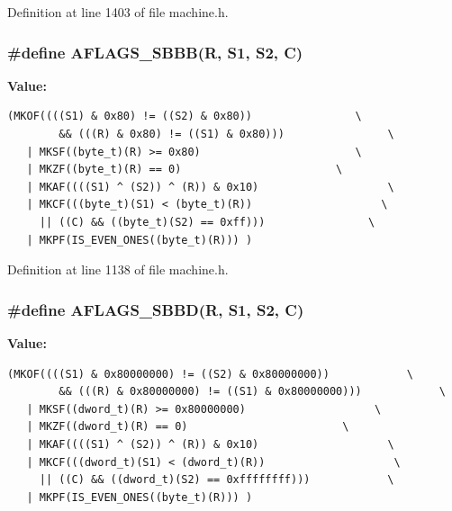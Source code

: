 Definition at line 1403 of file machine.h.
\subsubsection[{AFLAGS\_\-SBBB}]{\setlength{\rightskip}{0pt plus 5cm}\#define AFLAGS\_\-SBBB(R, \/  S1, \/  S2, \/  C)}\label{machine_8h_a652fae963869a94ffd34f33c5b41997}


\textbf{Value:}

\begin{Code}\begin{verbatim}(MKOF((((S1) & 0x80) != ((S2) & 0x80))                \
        && (((R) & 0x80) != ((S1) & 0x80)))                \
   | MKSF((byte_t)(R) >= 0x80)                        \
   | MKZF((byte_t)(R) == 0)                        \
   | MKAF((((S1) ^ (S2)) ^ (R)) & 0x10)                    \
   | MKCF(((byte_t)(S1) < (byte_t)(R))                    \
     || ((C) && ((byte_t)(S2) == 0xff)))                \
   | MKPF(IS_EVEN_ONES((byte_t)(R))) )
\end{verbatim}
\end{Code}


Definition at line 1138 of file machine.h.
\subsubsection[{AFLAGS\_\-SBBD}]{\setlength{\rightskip}{0pt plus 5cm}\#define AFLAGS\_\-SBBD(R, \/  S1, \/  S2, \/  C)}\label{machine_8h_1364188be8128fb7720f951f6cea39bf}


\textbf{Value:}

\begin{Code}\begin{verbatim}(MKOF((((S1) & 0x80000000) != ((S2) & 0x80000000))            \
        && (((R) & 0x80000000) != ((S1) & 0x80000000)))            \
   | MKSF((dword_t)(R) >= 0x80000000)                    \
   | MKZF((dword_t)(R) == 0)                        \
   | MKAF((((S1) ^ (S2)) ^ (R)) & 0x10)                    \
   | MKCF(((dword_t)(S1) < (dword_t)(R))                    \
     || ((C) && ((dword_t)(S2) == 0xffffffff)))            \
   | MKPF(IS_EVEN_ONES((byte_t)(R))) )
\end{verbatim}
\end{Code}


